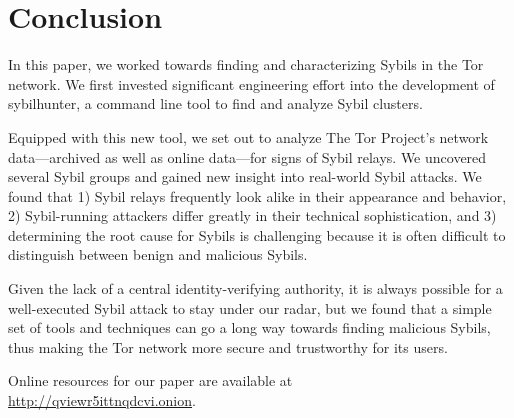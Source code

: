 \section{Conclusion}
\label{sec:conclusion}
In this paper, we worked towards finding and characterizing Sybils in the Tor
network.  We first invested significant engineering effort into the development
of sybilhunter, a command line tool to find and analyze Sybil clusters.

Equipped with this new tool, we set out to analyze The Tor Project's network
data---archived as well as online data---for signs of Sybil relays.  We
uncovered several Sybil groups and gained new insight into real-world Sybil
attacks.  We found that 1) Sybil relays frequently look alike in their
appearance and behavior, 2) Sybil-running attackers differ greatly in their
technical sophistication, and 3) determining the root cause for Sybils is
challenging because it is often difficult to distinguish between benign and
malicious Sybils.

Given the lack of a central identity-verifying authority, it is always possible
for a well-executed Sybil attack to stay under our radar, but we found that a
simple set of tools and techniques can go a long way towards finding malicious
Sybils, thus making the Tor network more secure and trustworthy for its users.

Online resources for our paper are available at \\
\url{http://qviewr5ittnqdcvi.onion}.

